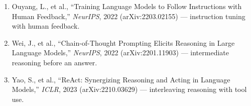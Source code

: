 \begin{small}
\begin{enumerate}
\item Ouyang, L., et al., ``Training Language Models to Follow Instructions with Human Feedback,'' \emph{NeurIPS}, 2022 (arXiv:2203.02155) — instruction tuning with human feedback.
\item Wei, J., et al., ``Chain-of-Thought Prompting Elicits Reasoning in Large Language Models,'' \emph{NeurIPS}, 2022 (arXiv:2201.11903) — intermediate reasoning before an answer.
\item Yao, S., et al., ``ReAct: Synergizing Reasoning and Acting in Language Models,'' \emph{ICLR}, 2023 (arXiv:2210.03629) — interleaving reasoning with tool use.
\end{enumerate}
\end{small}
